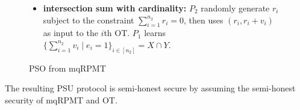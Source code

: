 \documentclass[a4paper,10pt]{article}
\begin{document}
\begin{figure}[!hbtp]
\begin{framed}
\begin{minipage}[center]{\textwidth}
\begin{trivlist}
\begin{enumerate}
\begin{itemize}
    \item \textbf{intersection sum with cardinality:} $P_2$ randomly generate $r_i$ 
        subject to the constraint $\sum_{i=1}^{n_2} r_i = 0$, then uses $(r_i, r_i + v_i)$ as input to the $i$th OT. 
        $P_1$ learns $\{\sum_{i=1}^{n_2} v_i \mid e_i = 1\}_{i \in [n_2]} = X \cap Y$. 
\end{itemize} 

\end{enumerate}
\end{trivlist}
\end{minipage}
\end{framed}
\caption{PSO from mqRPMT}\label{fig:PSO-from-mqRPMT}
\end{figure} 

\begin{theorem}
The resulting PSU protocol is semi-honest secure by assuming the semi-honest security of mqRPMT and OT.
\end{theorem}

\end{document}
